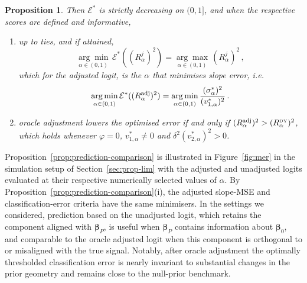 \documentclass{article}
\newtheorem{proposition}[theorem]{Proposition}
\theoremstyle{definition}
\newcommand*{\bb}{\boldsymbol}
\def\bbeta{\bb{\beta}}
\begin{document}
\begin{bibunit}
\begin{proposition}
Then $\mathcal E^*$ is strictly decreasing on $(0,1]$, and when the respective scores are defined and informative, 
\begin{enumerate}[label=(\roman*)]
    \item up to ties, and if attained, 
    \begin{equation}
    \label{eq:prediction-optimal-alpha}
        \underset{\alpha \in (0,1)}{\arg\min}\, \mathcal E^*((R_\alpha^j)^2)
        =
        \underset{\alpha \in (0,1)}{\arg\max}\,\left(R_\alpha^j\right)^2 \,, 
    \end{equation}
    which for the adjusted logit, is the $\alpha$ that minimises slope error, i.e. 
    $$
        \underset{\alpha \in (0,1)}{\arg\min}\,
        \mathcal E^*((R_\alpha^{\rm adj})^2)
        =
        \underset{\alpha \in (0,1)}{\arg\min}\,
        \frac{(\sigma_\alpha^*)^2}{(v_{1,\alpha}^*)^2}\,.
    $$
    \item oracle
    adjustment lowers the optimised error if and only if
    $(R_\alpha^{\mathrm{adj}})^2>(R_\alpha^{\textrm{\tiny DY}})^2$, which
    holds whenever $\varphi=0$, $v_{1,\alpha}^*\neq0$ and
    $\delta^2(v_{2,\alpha}^*)^2>0$.
\end{enumerate}
\end{proposition}
\noindent
Proposition~\ref{prop:prediction-comparison} is illustrated in
Figure~\ref{fig:mer} in the simulation setup of Section~\ref{sec:prop-lim} with the adjusted and unadjusted logits evaluated
at their respective numerically selected values of $\alpha$. By Proposition~\ref{prop:prediction-comparison}(i),
the adjusted slope-MSE and classification-error criteria have the same
minimisers.
In the settings we considered, prediction based on the unadjusted logit, which retains the component aligned with $\bbeta_P$, is useful when 
$\bbeta_P$ contains information about $\bbeta_0$, and comparable to the oracle adjusted logit when this component is 
orthogonal to or misaligned with the true signal. Notably, after oracle adjustment the optimally 
thresholded classification error is nearly invariant to substantial changes in the prior geometry and remains 
close to the null-prior benchmark. 



\end{bibunit}
\end{document}
